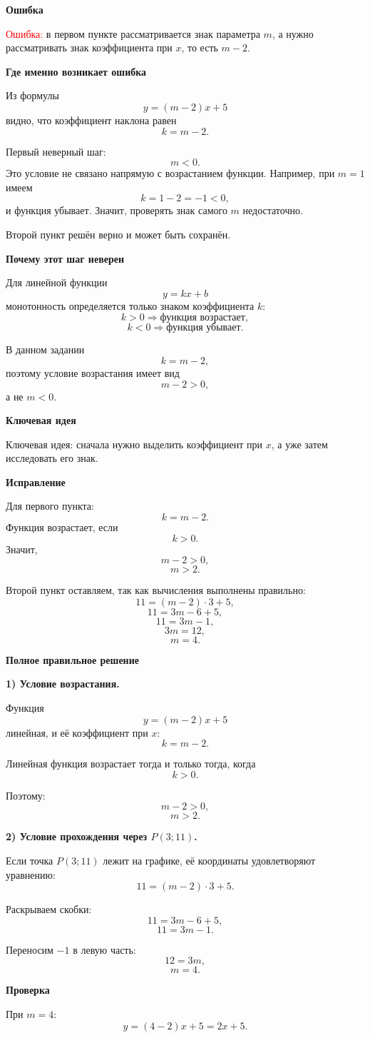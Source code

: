 \documentclass[12pt,a4paper]{article}
\newcommand{\reviewhead}[1]{%
  \par\medskip
  \noindent\textbf{#1}\par\smallskip
}
\begin{document}
\reviewhead{Ошибка}
\textcolor{red}{Ошибка:} в первом пункте рассматривается знак параметра \(m\), а нужно рассматривать знак коэффициента при \(x\), то есть \(m-2\).

\reviewhead{Где именно возникает ошибка}
Из формулы
\[
y=(m-2)x+5
\]
видно, что коэффициент наклона равен
\[
k=m-2.
\]

Первый неверный шаг:
\[
m<0.
\]
Это условие не связано напрямую с возрастанием функции. Например, при \(m=1\) имеем
\[
k=1-2=-1<0,
\]
и функция убывает. Значит, проверять знак самого \(m\) недостаточно.

Второй пункт решён верно и может быть сохранён.

\reviewhead{Почему этот шаг неверен}
Для линейной функции
\[
y=kx+b
\]
монотонность определяется только знаком коэффициента \(k\):
\[
k>0 \Rightarrow \text{функция возрастает},
\]
\[
k<0 \Rightarrow \text{функция убывает}.
\]

В данном задании
\[
k=m-2,
\]
поэтому условие возрастания имеет вид
\[
m-2>0,
\]
а не \(m<0\).

\reviewhead{Ключевая идея}
\textcolor{blue!60!black}{Ключевая идея:}
сначала нужно выделить коэффициент при \(x\), а уже затем исследовать его знак.

\reviewhead{Исправление}
Для первого пункта:
\[
k=m-2.
\]
Функция возрастает, если
\[
k>0.
\]
Значит,
\[
m-2>0,
\]
\[
m>2.
\]

Второй пункт оставляем, так как вычисления выполнены правильно:
\[
11=(m-2)\cdot 3+5,
\]
\[
11=3m-6+5,
\]
\[
11=3m-1,
\]
\[
3m=12,
\]
\[
m=4.
\]

\reviewhead{Полное правильное решение}
\textbf{1) Условие возрастания.}

Функция
\[
y=(m-2)x+5
\]
линейная, и её коэффициент при \(x\):
\[
k=m-2.
\]

Линейная функция возрастает тогда и только тогда, когда
\[
k>0.
\]

Поэтому:
\[
m-2>0,
\]
\[
\boxed{m>2}.
\]

\textbf{2) Условие прохождения через \(P(3;11)\).}

Если точка \(P(3;11)\) лежит на графике, её координаты удовлетворяют уравнению:
\[
11=(m-2)\cdot 3+5.
\]

Раскрываем скобки:
\[
11=3m-6+5,
\]
\[
11=3m-1.
\]

Переносим \(-1\) в левую часть:
\[
12=3m,
\]
\[
\boxed{m=4}.
\]

\reviewhead{Проверка}
При \(m=4\):
\[
y=(4-2)x+5=2x+5.
\]
\end{document}

